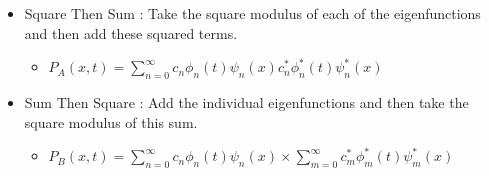 \documentclass[12pt]{article}
\begin{document}
\begin{itemize}
\item Square Then Sum : Take the square modulus of each of the eigenfunctions and then add these squared terms.
   \begin{itemize}
     \item $P_{A}(x,t)=\displaystyle\sum_{n=0}^{\infty}  c_{n}  \phi_{n}(t)  \psi_{n}(x) c_{n}^{*}  \phi_{n}^{*}(t)  \psi_{n}^{*}(x) $
   \end{itemize}
\item Sum Then Square : Add the individual eigenfunctions and then take the square modulus of this sum.
   \begin{itemize}
     \item $P_{B}(x,t)=\displaystyle\sum_{n=0}^{\infty}  c_{n}  \phi_{n}(t)  \psi_{n}(x) \times \displaystyle\sum_{m=0}^{\infty}  c_{m}^{*}  \phi_{m}^{*}(t)  \psi_{m}^{*}(x)$
   \end{itemize}
\end{itemize}
\end{document}
